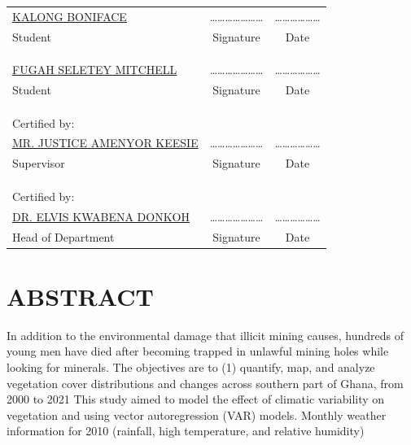 \documentclass[12pt,a4paper]{book}
\begin{document}
	\begin{center}
	\begin{tabular}{lcc}
		\underline{KALONG BONIFACE} &\quad\quad\quad \ldots\ldots\ldots\ldots\ldots\ldots\ldots &\quad\quad\quad \ldots\ldots\ldots\ldots\ldots\ldots \\
		Student &\quad\quad\quad Signature &\quad\quad\quad Date \\
		& & \\
		& & \\
		& & \\
		\underline{FUGAH SELETEY MITCHELL} &\quad\quad\quad \ldots\ldots\ldots\ldots\ldots\ldots\ldots &\quad\quad\quad \ldots\ldots\ldots\ldots\ldots\ldots \\
		Student &\quad\quad\quad Signature &\quad\quad\quad Date \\
		& & \\
		& & \\
		& & \\
		Certified by: & &\\
		\underline{MR. JUSTICE AMENYOR KEESIE} &\quad\quad\quad \ldots\ldots\ldots\ldots\ldots\ldots\ldots &\quad\quad\quad \ldots\ldots\ldots\ldots\ldots\ldots \\
		Supervisor &\quad\quad\quad Signature &\quad\quad\quad Date \\
		& & \\
		& & \\
		& & \\
		Certified by: & &\\
		\underline{DR. ELVIS KWABENA DONKOH} &\quad\quad\quad \ldots\ldots\ldots\ldots\ldots\ldots\ldots &\quad\quad\quad \ldots\ldots\ldots\ldots\ldots\ldots \\
		Head of Department &\quad\quad\quad Signature &\quad\quad\quad Date
	\end{tabular}
\end{center}
	
	
	\newpage
	\section*{\textbf{ABSTRACT}}
	In addition to the environmental damage that illicit mining causes, hundreds of young men have died after becoming trapped in unlawful mining holes while looking for minerals.
	The objectives are to (1) quantify, map, and analyze vegetation cover distributions and changes across southern part of Ghana, from 2000 to 2021
	This study aimed to model the effect of climatic variability on vegetation and using vector autoregression (VAR) models. Monthly weather information for 2010 (rainfall, high temperature, and relative humidity)
	
\end{document}

